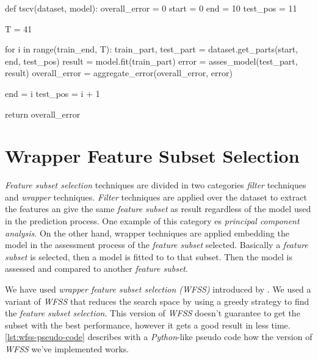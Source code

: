 \begin{code}[language = Python, frame = single,
  caption = {\textit{TSCV} pseudo code},
  label = lst:tscv-pseudo-code,
  captionpos = b][bth]
def tscv(dataset, model):
  overall_error = 0
  start = 0
  end = 10 
  test_pos = 11

  T = 41

  for i in range(train_end, T):
    train_part, test_part = dataset.get_parts(start, end,
                                              test_pos)
    result = model.fit(train_part)
    error = asses_model(test_part, result)
    overall_error = aggregate_error(overall_error, error)

    end = i
    test_pos = i + 1

  return overall_error
\end{code}

\chapter{Wrapper Feature Subset Selection}
\label{ch:wfss}

\textit{Feature subset selection} techniques are divided in two
categories \textit{filter} techniques and \textit{wrapper} techniques.
\textit{Filter} techniques are applied over the dataset to extract the
features an give the same \textit{feature subset} as result regardless
of the model used in the prediction process. One example of this
category es \textit{principal component analysis}. On the other hand,
wrapper techniques are applied embedding the model in the assessment
process of the \textit{feature subset} selected. Basically a
\textit{feature subset} is selected, then a model is fitted to to that
subset. Then the model is assessed and compared to another
\textit{feature subset}.

We have used \textit{wrapper feature subset selection (WFSS)}
introduced by \cite{kohavi1997wrappers}. We used a variant of
\textit{WFSS} that reduces the search space by using a greedy strategy
to find the \textit{feature subset selection}. This version of
\textit{WFSS} doesn't guarantee to get the subset with the best
performance, however it gets a good result in less time.
\autoref{lst:wfss-pseudo-code} describes with a \textit{Python}-like
pseudo code how the version of \textit{WFSS} we've implemented works.

